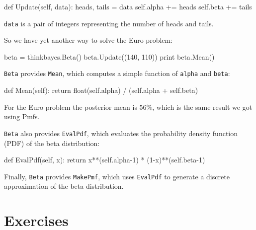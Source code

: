 \documentclass[12pt]{book}
\theoremstyle{exercise}
\begin{document}
\begin{code}
    def Update(self, data):
        heads, tails = data
        self.alpha += heads
        self.beta += tails
\end{code}

{\tt data} is a pair of integers representing the number of
heads and tails.

So we have yet another way to solve the Euro problem:

\begin{code}
    beta = thinkbayes.Beta()
    beta.Update((140, 110))
    print beta.Mean()
\end{code}

{\tt Beta} provides {\tt Mean}, which 
computes a simple function of {\tt alpha}
and {\tt beta}:

\begin{code}
    def Mean(self):
        return float(self.alpha) / (self.alpha + self.beta)
\end{code}

For the Euro problem the posterior mean is 56\%, which is the
same result we got using Pmfs.  

{\tt Beta} also provides {\tt EvalPdf}, which evaluates
the probability density
function (PDF)  of the beta distribution:

\begin{code}
    def EvalPdf(self, x):
        return x**(self.alpha-1) * (1-x)**(self.beta-1)
\end{code}

Finally, {\tt Beta} provides {\tt MakePmf}, which
uses {\tt EvalPdf} to generate a discrete approximation
of the beta distribution.





\section{Exercises}
\end{document}
